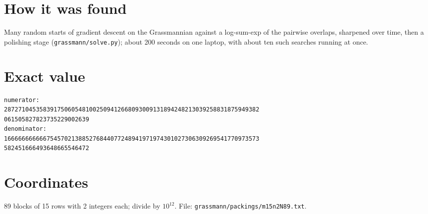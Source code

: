 \documentclass[11pt,a4paper]{article}
\begin{document}
\section{How it was found}
Many random starts of gradient descent on the Grassmannian against a log-sum-exp of the pairwise overlaps, sharpened over time, then a polishing stage (\texttt{grassmann/solve.py}); about 200 seconds on one laptop, with about ten such searches running at once.


\appendix
\section{Exact value}
{\small
\begin{verbatim}
numerator:
287271045358391750605481002509412668093009131894248213039258831875949382
061505827823735229002639
denominator:
166666666666754570213885276844077248941971974301027306309269541770973573
582451666493648665546472
\end{verbatim}}

\section{Coordinates}
89 blocks of 15 rows with 2 integers each; divide by $10^{12}$. File: \texttt{grassmann/packings/m15n2N89.txt}.
{\tiny
\begin{multicols}{4}
\end{multicols}}
\end{document}
